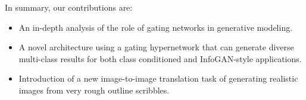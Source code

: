 
%
In summary, our contributions are:
\begin{itemize}
\item An in-depth analysis of the role of gating networks in generative modeling.
\item A novel architecture using a gating hypernetwork that can generate diverse multi-class results for both class conditioned and InfoGAN-style applications. 
\item Introduction of a new image-to-image translation task of generating realistic images from very rough outline scribbles.
\end{itemize}